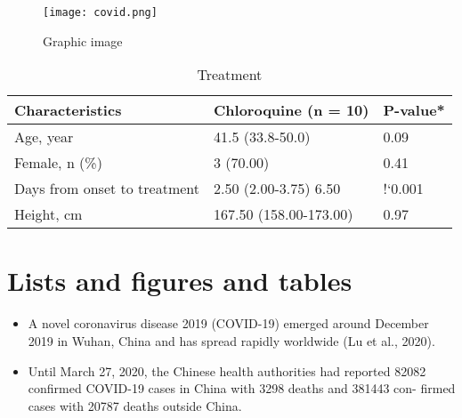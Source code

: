 \documentclass{article}
\begin{document}
\begin{figure}
\begin{center}
    \texttt{[image: covid.png]} %
    \caption{Graphic image} %
\end{center}
\end{figure}
\begin{table}

\begin{tabular}{|l|l|l|}
\hline 
    Characteristics              & Chloroquine (n = 10)    & P-value*\\ 
                       \hline
                       \hline
    Age, year                    &  41.5 (33.8-50.0)        & 0.09 \\ 
                       \hline 
     Female, n (\%)                &  3 (70.00)               & 0.41\\ 
                       \hline 
     Days from onset to treatment & 2.50 (2.00-3.75) 6.50   & !`0.001\\ 
    \hline 
    Height, cm                   & 167.50 (158.00-173.00)  &  0.97 \\  
                       \hline 
\end{tabular}
\caption{Treatment}
\label{tab:Treatment} %
\end{table} 

                  
\section{Lists and figures and tables}
\label{sec :l}
\begin{itemize}

\item A novel coronavirus disease 2019 (COVID-19) emerged around December
2019 in Wuhan, China and has spread rapidly worldwide (Lu et al., 2020).

\item Until March 27, 2020, the Chinese health authorities had reported 82082 confirmed COVID-19 cases in China with 3298 deaths and 381443 con-
firmed cases with 20787 deaths outside China.
\vspace{4mm}
	
\end{itemize}
\end{document}
